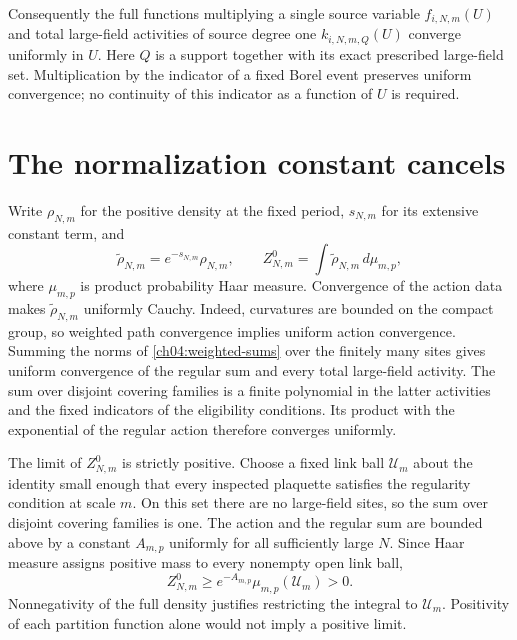 Consequently the full functions multiplying a single source variable $f_{i,N,m}(U)$ and
total large-field activities of source degree one $k_{i,N,m,Q}(U)$ converge uniformly in
$U$. Here $Q$ is a support together with its exact prescribed large-field set.
Multiplication by the indicator of a fixed Borel event preserves uniform convergence;
no continuity of this indicator as a function of $U$ is required.

\section{The normalization constant cancels}
\label{ch12:normalization}

Write $\rho_{N,m}$ for the positive density at the fixed period,
$s_{N,m}$ for its extensive constant term, and
\[
 \widetilde\rho_{N,m}=e^{-s_{N,m}}\rho_{N,m},\qquad
 Z^0_{N,m}=\int\widetilde\rho_{N,m}\,d\mu_{m,p},
\]
where $\mu_{m,p}$ is product probability Haar measure. Convergence
of the action data makes $\widetilde\rho_{N,m}$ uniformly Cauchy. Indeed,
curvatures are bounded on the compact group, so weighted path
convergence implies uniform action convergence. Summing the norms of
\eqref{ch04:weighted-sums} over the finitely many sites gives uniform convergence
of the regular sum and every total large-field activity. The sum over disjoint covering families
is a finite polynomial in the latter activities and the fixed indicators of the
eligibility conditions. Its product with the exponential of the regular action
therefore converges uniformly.

The limit of $Z^0_{N,m}$ is strictly positive. Choose a fixed link ball
$\mathcal U_m$ about the identity small enough that every inspected
plaquette satisfies the regularity condition at scale $m$. On this set there are no
large-field sites, so the sum over disjoint covering families is one. The action and the
regular sum are bounded above by a constant $A_{m,p}$ uniformly for
all sufficiently large $N$. Since Haar measure assigns positive mass to every
nonempty open link ball,
\begin{equation}
 Z^0_{N,m}\ge e^{-A_{m,p}}\mu_{m,p}(\mathcal U_m)>0.
 \label{ch12:positive-partition}
\end{equation}
Nonnegativity of the full density justifies restricting the integral
to $\mathcal U_m$. Positivity of each partition function alone would
not imply a positive limit.

